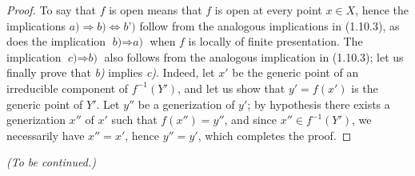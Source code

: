 \begin{proof}
To say that $f$ is open means that $f$ is open at every point $x\in X$,
hence the implications
$\textit{a)}\Rightarrow\textit{b)}\Leftrightarrow\textit{b')}$ follow from
the analogous implications in (1.10.3), as does the implication
$\textit{b)}\Rightarrow\textit{a)}$ when $f$ is locally of finite
presentation. The implication $\textit{c)}\Rightarrow\textit{b)}$ also
follows from the analogous implication in (1.10.3); let us finally prove that
\emph{b)} implies \emph{c)}. Indeed, let $x'$ be the generic point of an irreducible
component of $f^{-1}(Y')$, and let us show that $y'=f(x')$ is the generic
point of $Y'$. Let $y''$ be a generization of $y'$; by hypothesis there
exists a generization $x''$ of $x'$ such that $f(x'')=y''$, and since
$x''\in f^{-1}(Y')$, we necessarily have $x''=x'$, hence $y''=y'$, which
completes the proof.
\end{proof}

\begin{center}
\emph{(To be continued.)}
\end{center}

\clearpage
{}
{}

